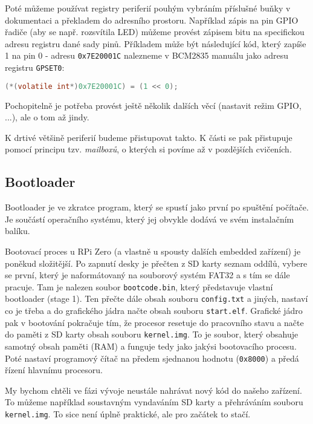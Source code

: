 \documentclass{article}
\begin{document}
Poté můžeme používat registry periferií pouhým vybráním příslušné buňky v dokumentaci a překladem do adresního prostoru. Například zápis na pin GPIO řadiče (aby se např. rozsvítila LED) můžeme provést zápisem bitu na specifickou adresu  registru dané sady pinů. Příkladem může být následující kód, který zapíše 1 na pin 0 - adresu \texttt{0x7E20001C} nalezneme v BCM2835 manuálu jako adresu registru \texttt{GPSET0}:

\begin{lstlisting}[language=C]
(*(volatile int*)0x7E20001C) = (1 << 0);
\end{lstlisting}

Pochopitelně je potřeba provést ještě několik dalších věcí (nastavit režim GPIO, ...), ale o tom až jindy.

K drtivé většině periferií budeme přistupovat takto. K části se pak přistupuje pomocí principu tzv. \emph{mailboxů}, o kterých si povíme až v pozdějších cvičeních.

\subsection{Bootloader}

Bootloader je ve zkratce program, který se spustí jako první po spuštění počítače. Je součástí operačního systému, který jej obvykle dodává ve svém instalačním balíku.

Bootovací proces u RPi Zero (a vlastně u spousty dalších embedded zařízení) je poněkud složitější. Po zapnutí desky je přečten z SD karty seznam oddílů, vybere se první, který je naformátovaný na souborový systém FAT32 a s tím se dále pracuje. Tam je nalezen soubor \texttt{bootcode.bin}, který představuje vlastní bootloader (stage 1). Ten přečte dále obsah souboru \texttt{config.txt} a jiných, nastaví co je třeba a do grafického jádra načte obsah souboru \texttt{start.elf}. Grafické jádro pak v bootování pokračuje tím, že procesor resetuje do pracovního stavu a načte do paměti z SD karty obsah souboru \texttt{kernel.img}. To je soubor, který obsahuje samotný obsah paměti (RAM) a funguje tedy jako jakýsi  bootovacího procesu. Poté nastaví programový čítač na předem sjednanou hodnotu (\texttt{0x8000}) a předá řízení hlavnímu procesoru.

My bychom chtěli ve fázi vývoje neustále nahrávat nový kód do našeho zařízení. To můžeme například soustavným vyndaváním SD karty a přehráváním souboru \texttt{kernel.img}. To sice není úplně praktické, ale pro začátek to stačí.
\end{document}
